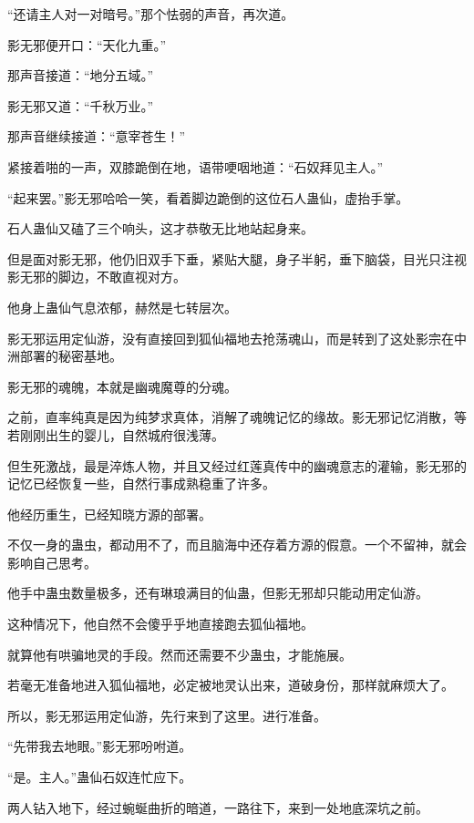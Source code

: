 
\begin{this_body}

“还请主人对一对暗号。”那个怯弱的声音，再次道。

影无邪便开口：“天化九重。”

那声音接道：“地分五域。”

影无邪又道：“千秋万业。”

那声音继续接道：“意宰苍生！”

紧接着啪的一声，双膝跪倒在地，语带哽咽地道：“石奴拜见主人。”

“起来罢。”影无邪哈哈一笑，看着脚边跪倒的这位石人蛊仙，虚抬手掌。

石人蛊仙又磕了三个响头，这才恭敬无比地站起身来。

但是面对影无邪，他仍旧双手下垂，紧贴大腿，身子半躬，垂下脑袋，目光只注视影无邪的脚边，不敢直视对方。

他身上蛊仙气息浓郁，赫然是七转层次。

影无邪运用定仙游，没有直接回到狐仙福地去抢荡魂山，而是转到了这处影宗在中洲部署的秘密基地。

影无邪的魂魄，本就是幽魂魔尊的分魂。

之前，直率纯真是因为纯梦求真体，消解了魂魄记忆的缘故。影无邪记忆消散，等若刚刚出生的婴儿，自然城府很浅薄。

但生死激战，最是淬炼人物，并且又经过红莲真传中的幽魂意志的灌输，影无邪的记忆已经恢复一些，自然行事成熟稳重了许多。

他经历重生，已经知晓方源的部署。

不仅一身的蛊虫，都动用不了，而且脑海中还存着方源的假意。一个不留神，就会影响自己思考。

他手中蛊虫数量极多，还有琳琅满目的仙蛊，但影无邪却只能动用定仙游。

这种情况下，他自然不会傻乎乎地直接跑去狐仙福地。

就算他有哄骗地灵的手段。然而还需要不少蛊虫，才能施展。

若毫无准备地进入狐仙福地，必定被地灵认出来，道破身份，那样就麻烦大了。

所以，影无邪运用定仙游，先行来到了这里。进行准备。

“先带我去地眼。”影无邪吩咐道。

“是。主人。”蛊仙石奴连忙应下。

两人钻入地下，经过蜿蜒曲折的暗道，一路往下，来到一处地底深坑之前。


\end{this_body}
